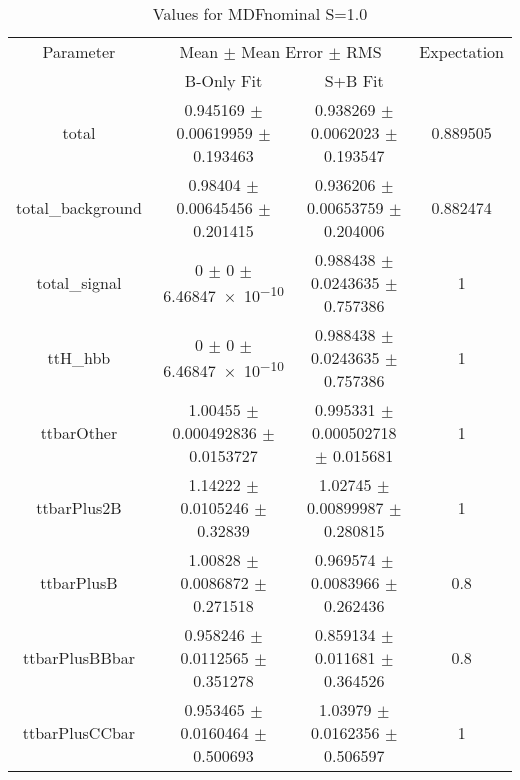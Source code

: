 \begin{table}
\centering
\caption{Values for MDFnominal S=1.0}
\begin{tabular}{cccc}
\toprule
Parameter & \multicolumn{2}{c}{Mean $\pm$ Mean Error $\pm$ RMS} & Expectation\\
 & B-Only Fit & S+B Fit & \\
\midrule
total & \num{0.945169} $\pm$ \num{0.00619959} $\pm$ \num{0.193463} & \num{0.938269} $\pm$ \num{0.0062023} $\pm$ \num{0.193547} & \num{0.889505}\\
total\_background & \num{0.98404} $\pm$ \num{0.00645456} $\pm$ \num{0.201415} & \num{0.936206} $\pm$ \num{0.00653759} $\pm$ \num{0.204006} & \num{0.882474}\\
total\_signal & \num{0} $\pm$ \num{0} $\pm$ \num{6.46847e-10} & \num{0.988438} $\pm$ \num{0.0243635} $\pm$ \num{0.757386} & \num{1}\\
ttH\_hbb & \num{0} $\pm$ \num{0} $\pm$ \num{6.46847e-10} & \num{0.988438} $\pm$ \num{0.0243635} $\pm$ \num{0.757386} & \num{1}\\
ttbarOther & \num{1.00455} $\pm$ \num{0.000492836} $\pm$ \num{0.0153727} & \num{0.995331} $\pm$ \num{0.000502718} $\pm$ \num{0.015681} & \num{1}\\
ttbarPlus2B & \num{1.14222} $\pm$ \num{0.0105246} $\pm$ \num{0.32839} & \num{1.02745} $\pm$ \num{0.00899987} $\pm$ \num{0.280815} & \num{1}\\
ttbarPlusB & \num{1.00828} $\pm$ \num{0.0086872} $\pm$ \num{0.271518} & \num{0.969574} $\pm$ \num{0.0083966} $\pm$ \num{0.262436} & \num{0.8}\\
ttbarPlusBBbar & \num{0.958246} $\pm$ \num{0.0112565} $\pm$ \num{0.351278} & \num{0.859134} $\pm$ \num{0.011681} $\pm$ \num{0.364526} & \num{0.8}\\
ttbarPlusCCbar & \num{0.953465} $\pm$ \num{0.0160464} $\pm$ \num{0.500693} & \num{1.03979} $\pm$ \num{0.0162356} $\pm$ \num{0.506597} & \num{1}\\
\bottomrule
\end{tabular}
\end{table}